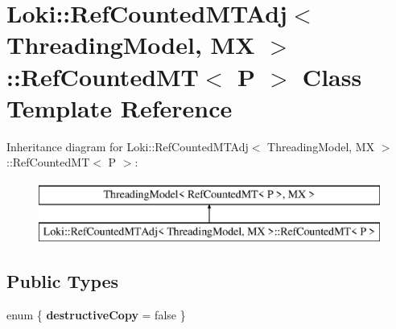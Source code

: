 \hypertarget{classLoki_1_1RefCountedMTAdj_1_1RefCountedMT}{}\section{Loki\+:\+:Ref\+Counted\+M\+T\+Adj$<$ Threading\+Model, M\+X $>$\+:\+:Ref\+Counted\+M\+T$<$ P $>$ Class Template Reference}
\label{classLoki_1_1RefCountedMTAdj_1_1RefCountedMT}
Inheritance diagram for Loki\+:\+:Ref\+Counted\+M\+T\+Adj$<$ Threading\+Model, M\+X $>$\+:\+:Ref\+Counted\+M\+T$<$ P $>$\+:\begin{figure}[H]
\begin{center}
\leavevmode
\includegraphics[height=2.000000cm]{classLoki_1_1RefCountedMTAdj_1_1RefCountedMT}
\end{center}
\end{figure}
\subsection*{Public Types}
\begin{DoxyCompactItemize}
\item 
\hypertarget{classLoki_1_1RefCountedMTAdj_1_1RefCountedMT_a5ae5d1bb28b3ebfa64be2a412ab2a3e4}{}enum \{ {\bfseries destructive\+Copy} = false
 \}\label{classLoki_1_1RefCountedMTAdj_1_1RefCountedMT_a5ae5d1bb28b3ebfa64be2a412ab2a3e4}

\end{DoxyCompactItemize}
